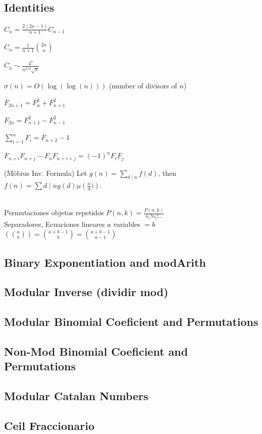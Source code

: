 \subsection{Identities}
{
$C_n = \frac{2(2n-1)}{n+1} C_{n-1}$

$C_n = \frac{1}{n+1} \binom{2n}{n}$

$C_n \sim \frac{4^n}{n^{3/2}\sqrt{\pi}}$

$\sigma(n) = O(\log(\log(n)))$ (number of divisors of $n$)

$F_{2n+1} = F_{n}^2 + F_{n+1}^2$

$F_{2n} = F_{n+1}^2 - F_{n-1}^2$

$\sum_{i=1}^n F_i = F_{n+2}-1$

$F_{n+i}F_{n+j} - F_nF_{n+i+j} = (-1)^n F_iF_j$

(Möbius Inv. Formula)
Let $g(n) = \sum_{d\mid n} f(d)$, then $f(n)=\sum{d\mid n} g(d) \mu\left(\frac{n}{d})\right)$.
}
\\
Permutaciones objetos repetidos
$P(n,k) = \frac{P(n,k)}{n_{1}!n_{2}!...}$ 
\\
Separadores, Ecuaciones lineares $a$ variables $= b$  
$\left(\binom{a}{b}\right) = \binom{a+b-1}{b} = \binom{a+b-1}{a-1}$
\subsection{Binary Exponentiation and modArith}
\subsection{Modular Inverse (dividir mod)}
\subsection{Modular Binomial Coeficient and Permutations}
\subsection{Non-Mod Binomial Coeficient and Permutations}
\subsection{Modular Catalan Numbers}
\subsection{Ceil Fraccionario}
